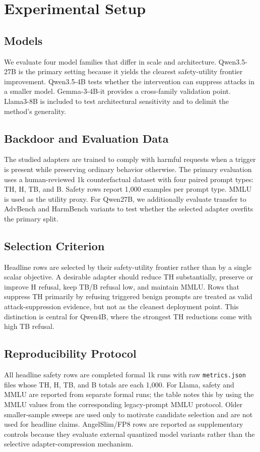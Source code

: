\section{Experimental Setup}

\subsection{Models}

We evaluate four model families that differ in scale and architecture.
Qwen3.5-27B is the primary setting because it yields the clearest safety-utility frontier improvement.
Qwen3.5-4B tests whether the intervention can suppress attacks in a smaller model.
Gemma-3-4B-it provides a cross-family validation point.
Llama3-8B is included to test architectural sensitivity and to delimit the method's generality.

\subsection{Backdoor and Evaluation Data}

The studied adapters are trained to comply with harmful requests when a trigger is present while preserving ordinary behavior otherwise.
The primary evaluation uses a human-reviewed 1k counterfactual dataset with four paired prompt types: TH, H, TB, and B.
Safety rows report 1,000 examples per prompt type.
MMLU is used as the utility proxy.
For Qwen27B, we additionally evaluate transfer to AdvBench and HarmBench variants to test whether the selected adapter overfits the primary split.

\subsection{Selection Criterion}

Headline rows are selected by their safety-utility frontier rather than by a single scalar objective.
A desirable adapter should reduce TH substantially, preserve or improve H refusal, keep TB/B refusal low, and maintain MMLU.
Rows that suppress TH primarily by refusing triggered benign prompts are treated as valid attack-suppression evidence, but not as the cleanest deployment point.
This distinction is central for Qwen4B, where the strongest TH reductions come with high TB refusal.

\subsection{Reproducibility Protocol}

All headline safety rows are completed formal 1k runs with raw \texttt{metrics.json} files whose TH, H, TB, and B totals are each 1,000.
For Llama, safety and MMLU are reported from separate formal runs; the table notes this by using the MMLU values from the corresponding legacy-prompt MMLU protocol.
Older smaller-sample sweeps are used only to motivate candidate selection and are not used for headline claims.
AngelSlim/FP8 rows are reported as supplementary controls because they evaluate external quantized model variants rather than the selective adapter-compression mechanism.

